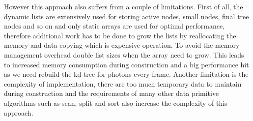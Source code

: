 However this approach also suffers from a couple of limitations. First of all, the dynamic lists are extensively used for storing active nodes, small nodes, final tree nodes and so on and only static arrays are used for optimal performance, therefore additional work has to be done to grow the lists by reallocating the memory and data copying which is expensive operation. To avoid the memory management overhead \citeauthor{Zhou2008} double list sizes when the array need to grow. This leads to increased memory consumption during construction and a big performance hit as we need rebuild the kd-tree for photons every frame. Another limitation is the complexity of implementation, there are too much temporary data to maintain during construction and the requirements of many other data primitive algorithms such as scan, split and sort also increase the complexity of this approach.
